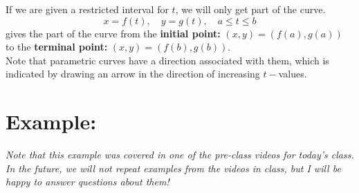 If we are given a restricted interval for \(t\), we will only get part of the curve.
\[
x = f(t), \quad y = g(t), \quad a \leq t \leq b
\]
gives the part of the curve from the \textbf{initial point:} \((x,y) = (f(a), g(a))\) \\
to the \textbf{terminal point:} \((x,y) = (f(b), g(b))\). \\

Note that parametric curves have a direction associated with them, which is indicated by drawing an arrow in the direction of increasing \(t-\)values.

%
%
%
%




\section*{Example:}
\textit{Note that this example was covered in one of the pre-class videos for today's class. In the future, we will not repeat examples from the videos in class, but I will be happy to answer questions about them!}

